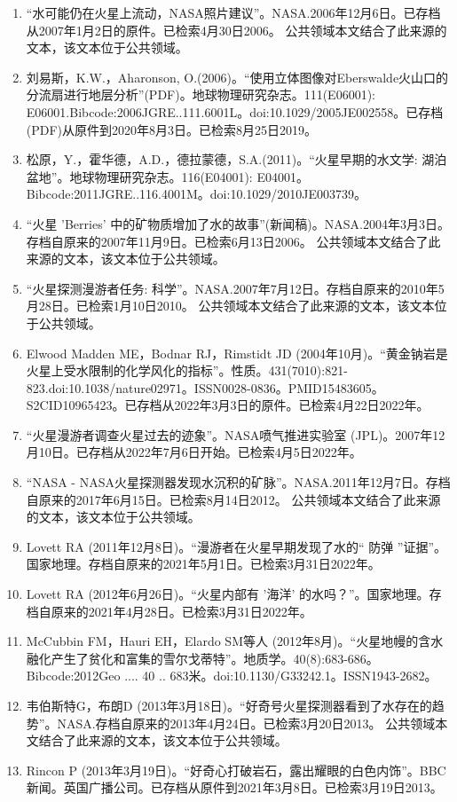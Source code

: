 \begin{enumerate}
\item “水可能仍在火星上流动，NASA照片建议”。NASA.2006年12月6日。已存档从2007年1月2日的原件。已检索4月30日2006。 公共领域本文结合了此来源的文本，该文本位于公共领域。
\item 刘易斯，K.W.，Aharonson, O.(2006)。“使用立体图像对Eberswalde火山口的分流扇进行地层分析”(PDF)。地球物理研究杂志。111(E06001): E06001.Bibcode:2006JGRE..111.6001L。doi:10.1029/2005JE002558。已存档(PDF)从原件到2020年8月3日。已检索8月25日2019。
\item 松原，Y.，霍华德，A.D.，德拉蒙德，S.A.(2011)。“火星早期的水文学: 湖泊盆地”。地球物理研究杂志。116(E04001): E04001。Bibcode:2011JGRE..116.4001M。doi:10.1029/2010JE003739。
\item “火星 'Berries' 中的矿物质增加了水的故事”(新闻稿)。NASA.2004年3月3日。存档自原来的2007年11月9日。已检索6月13日2006。 公共领域本文结合了此来源的文本，该文本位于公共领域。
\item “火星探测漫游者任务: 科学”。NASA.2007年7月12日。存档自原来的2010年5月28日。已检索1月10日2010。 公共领域本文结合了此来源的文本，该文本位于公共领域。
\item Elwood Madden ME，Bodnar RJ，Rimstidt JD (2004年10月)。“黄金钠岩是火星上受水限制的化学风化的指标”。性质。431(7010):821-823.doi:10.1038/nature02971。ISSN0028-0836。PMID15483605。S2CID10965423。已存档从2022年3月3日的原件。已检索4月22日2022年。   
\item “火星漫游者调查火星过去的迹象”。NASA喷气推进实验室 (JPL)。2007年12月10日。已存档从2022年7月6日开始。已检索4月5日2022年。
\item “NASA - NASA火星探测器发现水沉积的矿脉”。NASA.2011年12月7日。存档自原来的2017年6月15日。已检索8月14日2012。 公共领域本文结合了此来源的文本，该文本位于公共领域。
\item Lovett RA (2011年12月8日)。“漫游者在火星早期发现了水的“ 防弹 ”证据”。国家地理。存档自原来的2021年5月1日。已检索3月31日2022年。
\item Lovett RA (2012年6月26日)。“火星内部有 '海洋' 的水吗？”。国家地理。存档自原来的2021年4月28日。已检索3月31日2022年。
\item McCubbin FM，Hauri EH，Elardo SM等人 (2012年8月)。“火星地幔的含水融化产生了贫化和富集的雪尔戈蒂特”。地质学。40(8):683-686。Bibcode:2012Geo .... 40 .. 683米。doi:10.1130/G33242.1。ISSN1943-2682。 
\item 韦伯斯特G，布朗D (2013年3月18日)。“好奇号火星探测器看到了水存在的趋势”。NASA.存档自原来的2013年4月24日。已检索3月20日2013。 公共领域本文结合了此来源的文本，该文本位于公共领域。
\item Rincon P (2013年3月19日)。“好奇心打破岩石，露出耀眼的白色内饰”。BBC新闻。英国广播公司。已存档从原件到2021年3月8日。已检索3月19日2013。

\end{enumerate}
